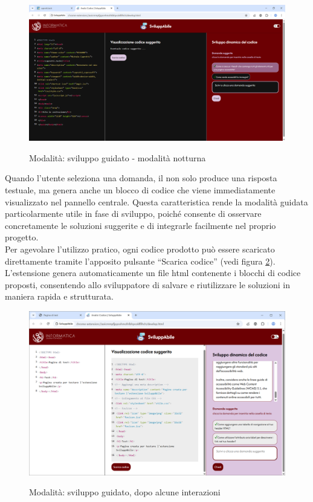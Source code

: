 \begin{figure}[H]
    \centering
    \includegraphics[width=1\linewidth, alt={Modalità di sviluppo guidato - modalità notturna}]{img/mg_dark.png}
    \caption{Modalità: sviluppo guidato - modalità notturna}\label{fig:mg_notte}
\end{figure}

\noindent Quando l’utente seleziona una domanda, il  non solo produce una risposta testuale, ma genera anche un blocco di codice che viene immediatamente visualizzato nel pannello centrale. Questa caratteristica rende la modalità guidata particolarmente utile in fase di sviluppo, poiché consente di osservare concretamente le soluzioni suggerite e di integrarle facilmente nel proprio progetto.\\
Per agevolare l’utilizzo pratico, ogni codice prodotto può essere scaricato direttamente tramite l’apposito pulsante “Scarica codice” (vedi figura \ref{fig:mg2}). L’estensione genera automaticamente un file \acrshort{html} contenente i blocchi di codice proposti, consentendo allo sviluppatore di salvare e riutilizzare le soluzioni in maniera rapida e strutturata.

\begin{figure}[H]
    \centering
    \includegraphics[width=1\linewidth, alt={Modalità di sviluppo guidato, dopo un'interazione}]{img/mg2.png}
    \caption{Modalità: sviluppo guidato, dopo alcune interazioni}\label{fig:mg2}
\end{figure}

